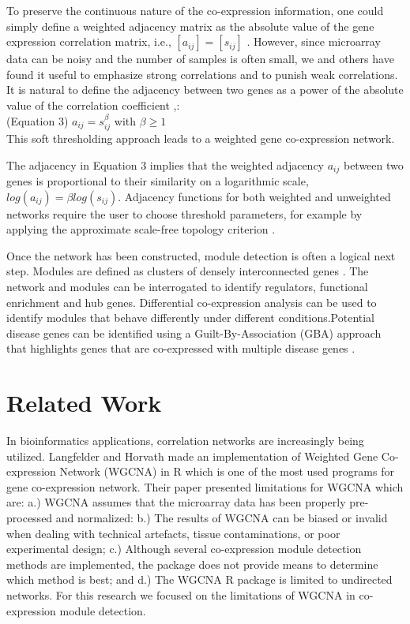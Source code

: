 \documentclass[sigconf,authordraft]{acmart}
\begin{document}
To preserve the continuous nature of the co-expression information, one could simply define a weighted adjacency matrix as the absolute value of the gene expression correlation matrix, i.e., $[a_{ij}]=[s_{ij}]$ . However, since microarray data can be noisy and the number of samples is often small, we and others have found it useful to emphasize strong correlations and to punish weak correlations. It is natural to define the adjacency between two genes as a power of the absolute value of the correlation coefficient \cite{ZhangHorvath2005},\cite{HorvathZhangEtal2006}: \\
(Equation 3) $a_{ij}=s_{ij}^{\beta}$ with $\beta \geq 1$ \\
This soft thresholding approach leads to a weighted gene co-expression network.

The adjacency in Equation 3 implies that the weighted adjacency $a_{ij}$ between two genes is proportional to their similarity on a logarithmic scale, $log(a_{ij}) = \beta log(s_{ij})$. Adjacency functions for both weighted and unweighted networks require the user to choose threshold parameters, for example by applying the approximate scale-free topology criterion \cite{YipHorvath2007}.

Once the network has been constructed, module detection is often a logical next step. Modules are defined as clusters of densely interconnected genes \cite{LangfelderHorvath2008}. The network and modules can be interrogated to identify regulators, functional enrichment and hub genes. Differential co-expression analysis can be used to identify modules that behave differently under different conditions.Potential disease genes can be identified using a Guilt-By-Association (GBA) approach that highlights genes that are co-expressed with multiple disease genes \cite{vanDamEtal2017}.

\section{Related Work}

In bioinformatics applications, correlation networks are increasingly being utilized. Langfelder and Horvath \cite{LangfelderHorvath2008} made an implementation of Weighted Gene Co-expression Network (WGCNA) in R which is one of the most used programs for gene co-expression network. Their paper presented limitations for WGCNA which are: a.) WGCNA assumes that the microarray data has been properly pre-processed and normalized: b.) The results of WGCNA can be biased or invalid when dealing with technical artefacts, tissue contaminations, or poor experimental design; c.) Although several co-expression module detection methods are implemented, the package does not provide means to determine which method is best; and d.) The WGCNA R package is limited to undirected networks. For this research we focused on the limitations of WGCNA in co-expression module detection.
\end{document}
